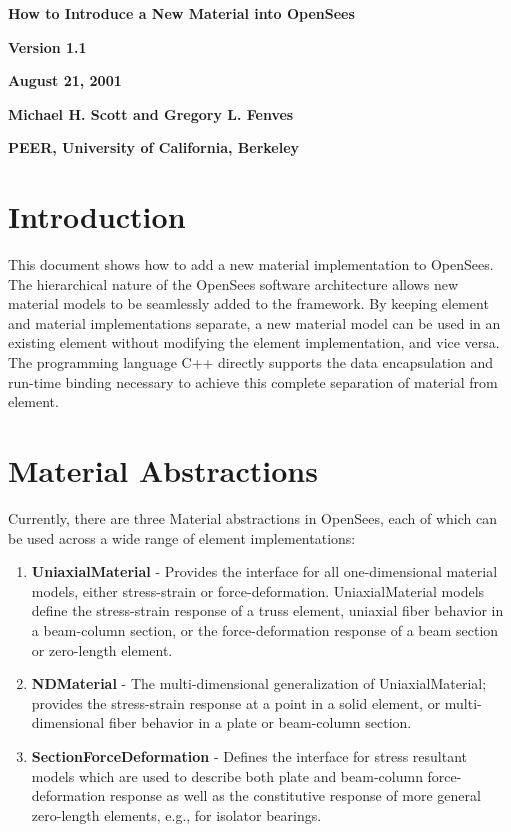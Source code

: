 \documentclass[12pt]{article}
\begin{document}


\begin{center}
{\bf \Large How to Introduce a New Material into OpenSees}

{\bf Version 1.1} 

{\bf August 21, 2001} 

{\bf Michael H. Scott and Gregory L. Fenves} 

{\bf PEER, University of California, Berkeley}
\end{center}

\section{Introduction}
This document shows how to add a new material implementation to OpenSees. The hierarchical
nature of the OpenSees software architecture allows new material models
to be seamlessly added to the framework. By keeping element and material implementations
separate, a new material model can be used in an existing element without modifying
the element implementation, and vice versa. The programming language C++ directly supports
the data encapsulation and run-time binding necessary to achieve this complete separation 
of material from element.

\section{Material Abstractions}
Currently, there are three Material abstractions in OpenSees, each of which can be used 
across a wide range of element implementations:

\begin{enumerate}
\item{\bf UniaxialMaterial} - Provides the interface for all one-dimensional material
models, either stress-strain or force-deformation.
UniaxialMaterial models define the stress-strain response of a truss element, uniaxial 
fiber behavior in a
beam-column section, or the force-deformation response of a beam section or
zero-length element.

\item{\bf NDMaterial} - The multi-dimensional generalization of UniaxialMaterial;
provides the stress-strain response at a point in a solid element, or multi-dimensional
fiber behavior in a plate or beam-column section.

\item{\bf SectionForceDeformation} - Defines the interface for stress resultant models
which are used to describe both plate and beam-column force-deformation response as well as
the constitutive response of more general zero-length elements, e.g., for isolator
bearings.
\end{enumerate}
\end{document}
